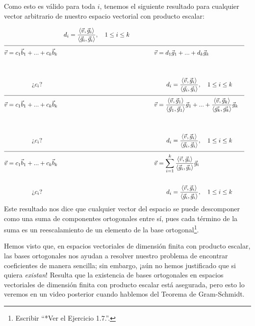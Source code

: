 \documentclass[12pt,dvipsnames]{article}
\numberwithin{equation}{section}
\begin{document}
Como esto es válido para toda $i$, tenemos el siguiente resultado para cualquier vector arbitrario de nuestro espacio vectorial con producto escalar:

\begin{align*}
    & &d_i = \frac{\langle \vec{v} ,\vec{g}_i \rangle}{\langle\vec{g}_i, \vec{g}_i\rangle}, \quad 1\le i\le k
    \\
    \cline{1-8}
    \vec{v}&= c_1\vec{b}_1 + ... + c_k\vec{b}_k& &\quad \quad \quad \quad \vec{v}= d_1\vec{g}_1 + ... + d_k\vec{g}_k& & & \\
    \\
    \\
           &\quad \quad \quad \quad \text{¿}c_i\text{?}& &\quad \quad \quad \quad \quad \quad d_i = \frac{\langle \vec{v} ,\vec{g}_i \rangle}{\langle\vec{g}_i, \vec{g}_i\rangle}, \quad 1\le i\le k& & &
    \\
    \cline{1-8}
    \vec{v}&= c_1\vec{b}_1 + ... + c_k\vec{b}_k& &\quad \quad \quad \quad \vec{v}= \frac{\langle \vec{v} , \vec{g}_1 \rangle}{\langle \vec{g}_1 , \vec{g}_1 \rangle}\vec{g}_1 + ... + \frac{\langle \vec{v} , \vec{g}_k \rangle}{\langle \vec{g_k} , \vec{g_k} \rangle}\vec{g}_k& & & \\
    \\
    \\
           &\quad \quad \quad \quad \text{¿}c_i\text{?}& &\quad \quad \quad \quad \quad \quad d_i = \frac{\langle \vec{v} ,\vec{g}_i \rangle}{\langle\vec{g}_i, \vec{g}_i\rangle}, \quad 1\le i\le k& & &
    \\
    \cline{1-8}
    \vec{v}&= c_1\vec{b}_1 + ... + c_k\vec{b}_k& &\quad \quad \quad \quad \vec{v}= \sum_{i=1}^k\frac{\langle \vec{v} , \vec{g}_i \rangle}{\langle \vec{g}_i , \vec{g}_i \rangle}\vec{g}_i & & &
    \\
    \\
           &\quad \quad \quad \quad \text{¿}c_i\text{?}& &\quad \quad \quad \quad \quad \quad d_i = \frac{\langle \vec{v} ,\vec{g}_i \rangle}{\langle\vec{g}_i, \vec{g}_i\rangle}, \quad 1\le i\le k& & &
\end{align*}
Este resultado nos dice que cualquier vector del espacio se puede descomponer como una suma de componentes ortogonales entre sí, pues cada término de la suma es un reescalamiento de un elemento de la base ortogonal\footnote{Escribir ``*Ver el Ejercicio 1.7.''.}.

Hemos visto que, en espacios vectoriales de dimensión finita con producto escalar, las bases ortogonales nos ayudan a resolver nuestro problema de encontrar coeficientes de manera sencilla; sin embargo, ¡aún no hemos justificado que si quiera \emph{existan}! Resulta que la existencia de bases ortogonales en espacios vectoriales de dimensión finita con producto escalar está asegurada, pero esto lo veremos en un video posterior cuando hablemos del Teorema de Gram-Schmidt.
\end{document}
